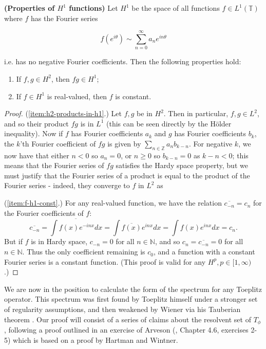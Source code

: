 \documentclass[../main.tex]{subfiles}
\begin{document}
\begin{lemma}{\textbf{(Properties of $H^1$ functions)}}\label{thm:h1-properties}
Let $H^1$ be the space of all functions $f \in L^1(\mathbb{T})$ where $f$ has the Fourier series

$$f(e^{i \theta}) \sim \sum_{n=0}^\infty a_n e^{i n \theta}$$

i.e. has no negative Fourier coefficients. Then the following properties hold:
\begin{enumerate}
\item\label{item:h2-products-in-h1} If $f, g \in H^2$, then $fg \in H^1$;
\item\label{item:f-h1-const} If $f \in H^1$ is real-valued, then $f$ is constant.
\end{enumerate}
\end{lemma}
\begin{proof}
(\ref{item:h2-products-in-h1}.) Let $f, g$ be in $H^2$. Then in particular, $f, g \in L^2$, and so their product $fg$ is in $L^1$ (this can be seen directly by the H\"older inequality). Now if $f$ has Fourier coefficients $a_k$ and $g$ has Fourier coefficients $b_k$, the $k$'th Fourier coefficient of $fg$ is given by $\sum_{n \in \mathbb{Z}} a_n b_{k-n}$. For negative $k$, we now have that either $n < 0$ so $a_n = 0$, or $n \geq 0$ so $b_{k-n} = 0$ as $k-n < 0$;
this means that the Fourier series of $fg$ satisfies the Hardy space property, but we must justify that the Fourier series of a product is equal to the product of the Fourier series - indeed, they converge to $f$ in $L^2$ as 

(\ref{item:f-h1-const}.) For any real-valued function, we have the relation $\overline{c_{-n}} = c_n$ for the Fourier coefficients of $f$:
$$ \overline{c_{-n}} = \overline{\int f(x) e^{-inx} dx} = \int \overline{f(x)} e^{inx} dx = \int f(x) e^{inx} dx = c_n.$$
But if $f$ is in Hardy space, $c_{-n} = 0$ for all $n \in \mathbb{N}$, and so $c_n = \overline{c_{-n}} = 0$ for all $n \in \mathbb{N}$. Thus
the only coefficient remaining is $c_0$, and a function with a constant Fourier series is a constant function. (This proof is valid for any $H^p, p \in [1, \infty)$.)
\end{proof}

We are now in the position to calculate the form of the spectrum for any Toeplitz operator. This spectrum was first found by Toeplitz
himself under a stronger set of regularity assumptions, and then weakened by Wiener via his Tauberian theorem \parencite{schmidt1960toeplitz}.
Our proof will consist of a series of claims about the resolvent set of $T_\phi$, following a proof outlined in an exercise of Arveson (\parencite{arveson2002short}, Chapter 4.6, exercises 2-5) which is based on a proof by Hartman and Wintner.
\end{document}
